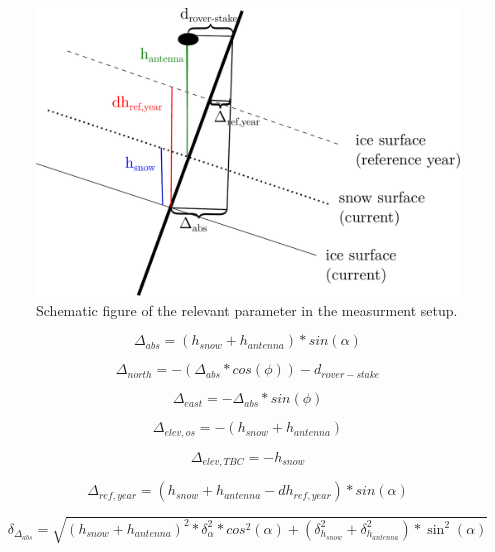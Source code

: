 \begin{figure}
\centering
\includegraphics[width=\linewidth]{./figs/pictures/schematic_setup.pdf}
\caption{Schematic figure of the relevant parameter in the measurment setup.}
\end{figure}

\begin{equation}
	\Delta_{abs} = (h_{snow} + h_{antenna}) * sin(\alpha)
\end{equation}

\begin{equation}
	\Delta_{north} = - (\Delta_{abs} * cos(\phi)) - d_{rover-stake}
\end{equation}

\begin{equation}
	\Delta_{east} = - \Delta_{abs} * sin(\phi)
\end{equation}

\begin{equation}
	\Delta_{elev,os} = - (h_{snow} + h_{antenna}) 
\end{equation}

\begin{equation}
	\Delta_{elev,TBC} = - h_{snow} 
\end{equation}

\begin{equation}
	\Delta_{ref,year} = (h_{snow} + h_{antenna} - dh_{ref,year}) * sin(\alpha)
\end{equation}


\begin{equation}
	\delta_{\Delta_{abs}} = \sqrt{(h_{snow} + h_{antenna})^2 * \delta_{\alpha}^2 * cos^2(\alpha) + (\delta_{h_{snow}}^2 + \delta_{h_{antenna}}^2) * \sin^2(\alpha)}
\end{equation}

